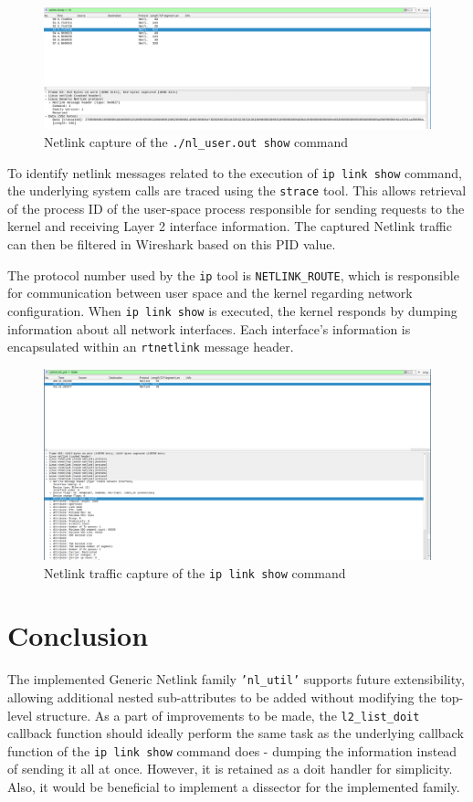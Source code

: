\documentclass[10pt, letterpaper]{article}
\begin{document}
\begin{figure}[ht]
	\centering
	\includegraphics[width=1\textwidth]{./images/raw_hex.png}
	\caption{Netlink capture of the \texttt{./nl\_user.out show} command}
\end{figure}

To identify netlink messages related to the execution of \texttt{ip link show} command,
the underlying system calls are traced using the \texttt{strace} tool. This allows
retrieval of the process ID of the user-space process responsible for sending
requests to the kernel and receiving Layer 2 interface information. The captured Netlink
traffic can then be filtered in Wireshark based on this PID value.

The protocol number used by the \texttt{ip} tool is \texttt{NETLINK\_ROUTE}, which is responsible
for communication between user space and the kernel regarding network configuration. When
\texttt{ip link show} is executed, the kernel responds by dumping information about all
network interfaces. Each interface's information is encapsulated within an
\texttt{rtnetlink} message header.

\begin{figure}[ht]
	\centering
	\includegraphics[width=1\textwidth]{./images/ip_link_show_capture.png}
	\caption{Netlink traffic capture of the \texttt{ip link show} command}
\end{figure}

\section{Conclusion}
The implemented Generic Netlink family \texttt{'nl\_util'} supports future extensibility,
allowing additional nested sub-attributes to be added without modifying the top-level
structure. As a part of improvements to be made, the \texttt{l2\_list\_doit} callback
function should ideally perform the same task as the underlying callback function of the
\texttt{ip link show} command does - dumping the information instead of sending it all at once.
However, it is retained as a doit handler for simplicity. Also, it would be beneficial to
implement a dissector for the implemented family.
\end{document}
